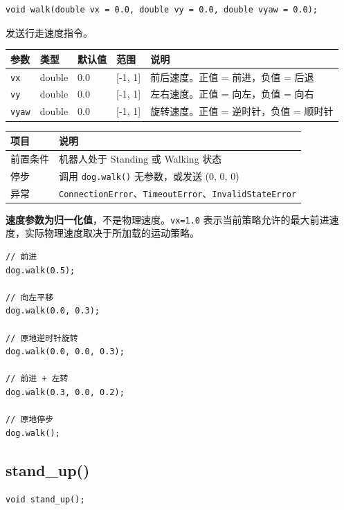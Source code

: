 \documentclass[a4paper,11pt,openany]{book}
\begin{document}
\begin{lstlisting}[style=cpp,numbers=none]
void walk(double vx = 0.0, double vy = 0.0, double vyaw = 0.0);
\end{lstlisting}

发送行走速度指令。

\begin{longtable}{lllll}
\toprule
参数 & 类型 & 默认值 & 范围 & 说明 \\
\midrule
\endhead
\texttt{vx}   & double & 0.0 & {[}-1, 1{]} & 前后速度。正值 = 前进，负值 = 后退 \\
\texttt{vy}   & double & 0.0 & {[}-1, 1{]} & 左右速度。正值 = 向左，负值 = 向右 \\
\texttt{vyaw} & double & 0.0 & {[}-1, 1{]} & 旋转速度。正值 = 逆时针，负值 = 顺时针 \\
\bottomrule
\end{longtable}

\begin{longtable}{ll}
\toprule
项目 & 说明 \\
\midrule
\endhead
前置条件 & 机器人处于 Standing 或 Walking 状态 \\
停步 & 调用 \texttt{dog.walk()} 无参数，或发送 (0, 0, 0) \\
异常 & \texttt{ConnectionError}、\texttt{TimeoutError}、\texttt{InvalidStateError} \\
\bottomrule
\end{longtable}

\textbf{速度参数为归一化值}，不是物理速度。\texttt{vx=1.0} 表示当前策略允许的最大前进速度，实际物理速度取决于所加载的运动策略。

\begin{lstlisting}[style=cpp]
// 前进
dog.walk(0.5);

// 向左平移
dog.walk(0.0, 0.3);

// 原地逆时针旋转
dog.walk(0.0, 0.0, 0.3);

// 前进 + 左转
dog.walk(0.3, 0.0, 0.2);

// 原地停步
dog.walk();
\end{lstlisting}

\subsection{stand\_up()}

\begin{lstlisting}[style=cpp,numbers=none]
void stand_up();
\end{lstlisting}
\end{document}
